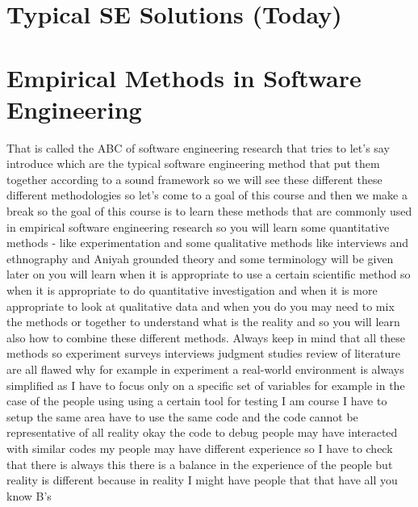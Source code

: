 \documentclass[conference, compsoc, twoside]{IEEEtran}
\begin{document}
\section{Typical SE Solutions (Today)} %
\label{sec:typical_se_solutions_today}


\section{Empirical Methods in Software Engineering}
That is called the ABC of software engineering research that tries to let's say introduce which are the typical software engineering method that put them together according to a sound framework so we will see these different these different methodologies so let's come to a goal of this course and then we make a break so the goal of this course is to learn these methods that are commonly used in empirical software engineering research so you will learn some quantitative methods - like experimentation and some qualitative methods like interviews and ethnography and Aniyah grounded theory and some terminology will be given later on you will learn when it is appropriate to use a certain scientific method so when it is appropriate to do quantitative investigation and when it is more appropriate to look at qualitative data and when you do you may need to mix the methods or together to understand what is the reality and so you will learn also how to combine these different methods. 
 Always keep in mind that all these methods so experiment surveys interviews judgment studies review of literature are all flawed why 
for example in experiment a real-world environment is always simplified as I have to focus only on a specific set of variables 
for example in the case of the people using using a certain tool for testing I am course I have to setup the same area have to use the same code and the code cannot be representative of all reality okay the code to debug people may have interacted with similar codes my people may have different experience 
so I have to check that there is always this there is a balance in the experience of the people but reality is different because in reality I might have people that that have all you know B's 
\end{document}
